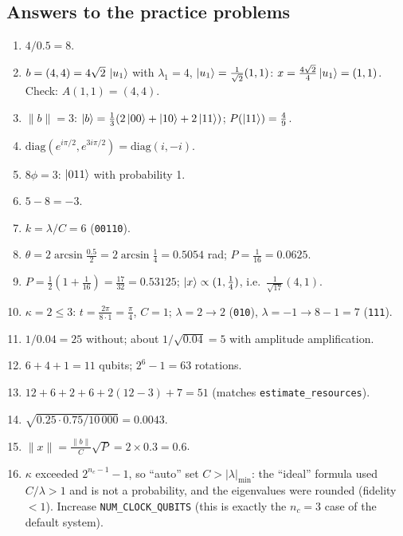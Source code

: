 \documentclass[11pt,a4paper,openany]{book}
\begin{document}
\newpage
\subsection*{Answers to the practice problems}
\begin{enumerate}[label=\textbf{P\arabic*.}, leftmargin=2.6em, itemsep=3pt]
\item $4/0.5 = 8$.
\item $b = (4, 4) = 4\sqrt2\,\ket{u_1}$ with $\lambda_1 = 4$, $\ket{u_1} = \frac{1}{\sqrt2}(1, 1)$: $x = \frac{4\sqrt2}{4}\ket{u_1} = (1, 1)$. Check: $A(1, 1) = (4, 4)$.
\item $\|b\| = 3$: $\ket b = \frac13(2\ket{00} + \ket{10} + 2\ket{11})$; $P(\ket{11}) = \frac49$.
\item $\mathrm{diag}(e^{i\pi/2}, e^{3i\pi/2}) = \mathrm{diag}(i, -i)$.
\item $8\phi = 3$: $\ket{011}$ with probability 1.
\item $5 - 8 = -3$.
\item $k = \lambda/C = 6$ (\texttt{00110}).
\item $\theta = 2\arcsin\frac{0.5}{2} = 2\arcsin\frac14 = 0.5054$ rad; $P = \frac1{16} = 0.0625$.
\item $P = \frac12(1 + \frac1{16}) = \frac{17}{32} = 0.53125$; $\ket x \propto (1, \frac14)$, i.e.\ $\frac{1}{\sqrt{17}}(4, 1)$.
\item $\kappa = 2 \le 3$: $t = \frac{2\pi}{8\cdot1} = \frac\pi4$, $C = 1$; $\lambda = 2 \to 2$ (\texttt{010}), $\lambda = -1 \to 8 - 1 = 7$ (\texttt{111}).
\item $1/0.04 = 25$ without; about $1/\sqrt{0.04} = 5$ with amplitude amplification.
\item $6 + 4 + 1 = 11$ qubits; $2^6 - 1 = 63$ rotations.
\item $12 + 6 + 2 + 6 + 2(12 - 3) + 7 = 51$ (matches \texttt{estimate\_resources}).
\item $\sqrt{0.25\cdot0.75/10\,000} = 0.0043$.
\item $\|x\| = \frac{\|b\|}{C}\sqrt P = 2\times0.3 = 0.6$.
\item $\kappa$ exceeded $2^{n_c-1} - 1$, so ``auto'' set $C > |\lambda|_{\min}$: the ``ideal'' formula used $C/\lambda > 1$ and is not a probability, and the eigenvalues were rounded
      (fidelity $< 1$). Increase \texttt{NUM\_CLOCK\_QUBITS} (this is exactly the $n_c = 3$ case of the default system).
\end{enumerate}
\end{document}

